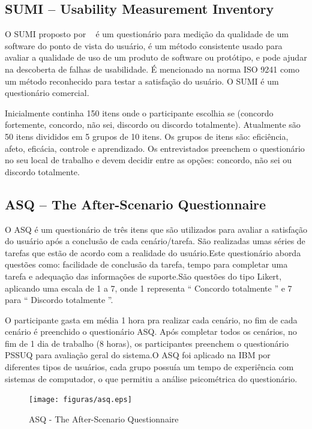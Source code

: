 \subsection{SUMI – Usability Measurement Inventory}

	O SUMI proposto por ~ é um questionário para medição da qualidade de um software do ponto de vista do usuário, é um método consistente usado para avaliar a qualidade de uso de um produto de software ou protótipo, e pode ajudar na descoberta de falhas de usabilidade. É mencionado na norma ISO 9241 como um método reconhecido para testar a satisfação do usuário. O SUMI é um questionário comercial. 

	Inicialmente continha 150 itens onde o participante escolhia se (concordo fortemente, concordo, não sei, discordo ou discordo totalmente). Atualmente são 50 itens divididos em 5 grupos de 10 itens. Os grupos de itens são: eficiência, afeto, eficácia, controle e aprendizado. Os entrevistados preenchem o questionário no seu local de trabalho e devem decidir entre as opções: concordo, não sei ou discordo totalmente.

\subsection{ASQ – The After-Scenario Questionnaire}

O ASQ é um questionário de três itens que são utilizados para avaliar a satisfação do usuário após a conclusão de cada cenário/tarefa. São realizadas umas séries de tarefas que estão de acordo com a realidade do usuário.Este questionário aborda questões como: facilidade de conclusão da tarefa, tempo para completar uma tarefa e adequação das informações de suporte.São questões do tipo Likert, aplicando uma escala de 1 a 7, onde 1 representa “ Concordo totalmente ” e 7 para “ Discordo totalmente ”. ~\cite{lewis1995ibm}

O participante gasta em média 1 hora pra realizar cada cenário, no fim de cada cenário é preenchido o questionário ASQ. Após completar todos os cenários, no fim de 1 dia de trabalho (8 horas), os participantes preenchem o questionário PSSUQ para avaliação geral do sistema.O ASQ foi aplicado na IBM por diferentes tipos de usuários, cada grupo possuía um tempo de experiência com sistemas de computador, o que permitiu a análise psicométrica do questionário.

\begin{figure}[!h]
    \centering
    \texttt{[image: figuras/asq.eps]}
    \label{ASQ - The After-Scenario Questionnaire }
	\caption{ASQ - The After-Scenario Questionnaire}
\end{figure}

